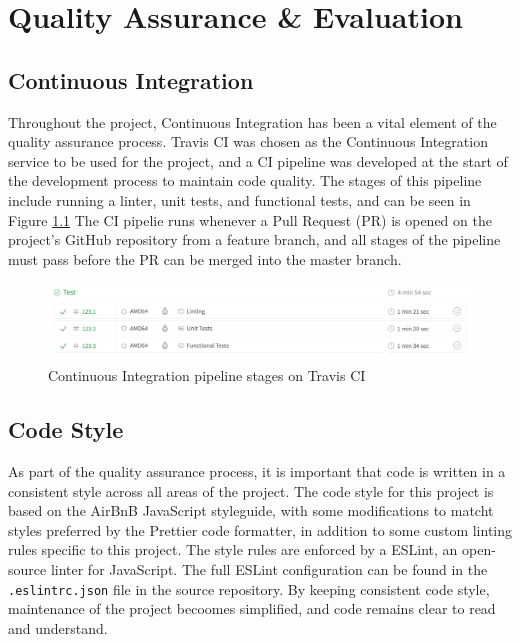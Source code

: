 \chapter{Quality Assurance \& Evaluation}


\section{Continuous Integration}
Throughout the project, Continuous Integration has been a vital element of the quality assurance process. Travis CI was chosen as the Continuous Integration service to be used for the project, and a CI pipeline was developed at the start of the development process to maintain code quality. The stages of this pipeline include running a linter, unit tests, and functional tests, and can be seen in Figure \ref{fig:ci-pipeline} The CI pipelie runs whenever a Pull Request (PR) is opened on the project's GitHub repository from a feature branch, and all stages of the pipeline must pass before the PR can be merged into the master branch.

\begin{figure}[h!]
  \centering
  \includegraphics[width=\textwidth]{images/ci-pipeline.png}
  \caption{Continuous Integration pipeline stages on Travis CI}
  \label{fig:ci-pipeline}
\end{figure}

\section{Code Style}
As part of the quality assurance process, it is important that code is written in a consistent style across all areas of the project. The code style for this project is based on the AirBnB JavaScript styleguide, with some modifications to matcht styles preferred by the Prettier code formatter, in addition to some custom linting rules specific to this project. The style rules are enforced by a ESLint, an open-source linter for JavaScript. The full ESLint configuration can be found in the \verb|.eslintrc.json| file in the source repository. By keeping consistent code style, maintenance of the project becoomes simplified, and code remains clear to read and understand.

